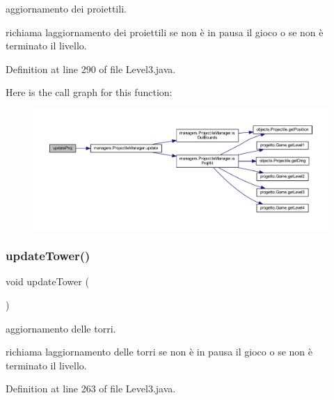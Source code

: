 aggiornamento dei proiettili. 

richiama l\textquotesingle{}aggiornamento dei proiettili se non è in pausa il gioco o se non è terminato il livello. 

Definition at line 290 of file Level3.\+java.

Here is the call graph for this function\+:
\nopagebreak
\begin{figure}[H]
\begin{center}
\leavevmode
\includegraphics[width=350pt]{classscenes_1_1_level3_ac83c203b559f6fd0bb225744d7ccf854_cgraph}
\end{center}
\end{figure}
\mbox{\label{classscenes_1_1_level3_ae4fd4a959e4d782a5e7ac0eff77ba27f}} 
\subsubsection{\texorpdfstring{update\+Tower()}{updateTower()}}
{\footnotesize\ttfamily void update\+Tower (\begin{DoxyParamCaption}{ }\end{DoxyParamCaption})}



aggiornamento delle torri. 

richiama l\textquotesingle{}aggiornamento delle torri se non è in pausa il gioco o se non è terminato il livello. 

Definition at line 263 of file Level3.\+java.

